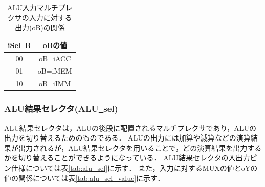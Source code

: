 \documentclass[a4paper,11pt]{ltjsarticle}
\begin{document}
\begin{table}[H]
    \centering
    \caption{ALU入力マルチプレクサの入力に対する出力(oB)の関係}
    \label{tab:alu_mux_value2}
    \begin{tabular}{|c|c|}
        \hline
        iSel\underline{~}B & oBの値    \\
        \hline
        00                 & oB=iACC \\
        \hline
        01                 & oB=iMEM \\
        \hline
        10                 & oB=iIMM \\
        \hline
    \end{tabular}
\end{table}
\subsubsection{ALU結果セレクタ(ALU\underline{~}sel)}
ALU結果セレクタは，ALUの後段に配置されるマルチプレクサであり，ALUの出力を切り替えるためのものである．
ALUの出力には加算や減算などの演算結果が出力されるが，ALU結果セレクタを用いることで，どの演算結果を出力するかを切り替えることができるようになっている．
ALU結果セレクタの入出力ピン仕様については表\ref{tab:alu_sel}に示す．
また，入力に対するMUXの値とoYの値の関係については表\ref{tab:alu_sel_value}に示す．
\end{document}
